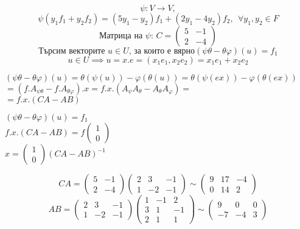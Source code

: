 \documentclass{article}
\begin{document}
\[
    \psi : V \longrightarrow V,
\]
\[
    \psi ( y_1 f_1 + y_2 f_2) = ( 5 y_1 - y_2) f_1 + ( 2 y_1 - 4 y_2) f_2, \ \ \forall y_1, y_2 \in F
\]
\[
    \text{Матрица на $\psi$: }
    C=
    \left(\begin{array}{cc}
            5 & -1 \\
            2 & -4
        \end{array}
    \right)
\]
\newpage
\[
    \text{Търсим векторите $u\in U$, за които е вярно}( \psi \theta - \theta \varphi) (u) = f_1
\]
\[
    u\in U \implies u = x.e = (x_1e_1,x_2e_2) = x_1e_1+x_2e_2
\]
\begin{center}
    $( \psi \theta - \theta \varphi) (u) =\theta(\psi(u)) -  \varphi(\theta(u)) = \theta(\psi(ex)) -  \varphi(\theta(ex))$
    $= (f.A_{\psi\theta}-f.A_{\theta\varphi}).x = f.x.(A_\psi A_\theta-A_\theta A_\varphi)=$\\
    $=f.x.(CA-AB)$
\end{center}
\begin{center}
    $( \psi \theta - \theta \varphi) (u) = f_1$\\
    $f.x.(CA-AB) = f\left(\begin{array}{c}
                1 \\
                0
            \end{array}\right)$\\
    $x=\left(\begin{array}{c}
            1 \\
            0
        \end{array}\right)(CA-AB)^{-1}$
\end{center}
\[
    CA=
    \left(\begin{array}{cc}
            5 & -1 \\
            2 & -4
        \end{array}
    \right)\left(\begin{array}{ccc}
            2 & 3  & -1 \\
            1 & -2 & -1
        \end{array}
    \right)\sim
    \left(\begin{array}{ccc}
            9 & 17 & -4 \\
            0 & 14 & 2
        \end{array}
    \right)
\]
\[
    AB=
    \left(\begin{array}{ccc}
            2 & 3  & -1 \\
            1 & -2 & -1
        \end{array}
    \right)
    \left(\begin{array}{ccc}
            1 & -1 & 2  \\
            3 & 1  & -1 \\
            2 & 1  & 1
        \end{array}
    \right)\sim
    \left(\begin{array}{ccc}
            9  & 0  & 0 \\
            -7 & -4 & 3
        \end{array}
    \right)
\]
\end{document}
